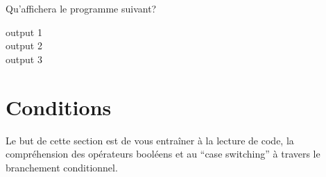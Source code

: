\begin{Exercice}[5 minutes] Qu'affichera le programme suivant?
    
    

    \begin{solution}
        output 1\\
        output 2\\
        output 3
    \end{solution}
    
\end{Exercice}

\newpage
\section{Conditions}
Le but de cette section est de vous entraîner à la lecture de code, la compréhension des opérateurs booléens et au ``case switching'' à travers le branchement conditionnel.
\\
